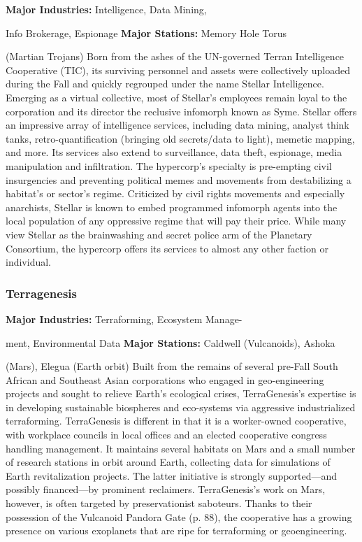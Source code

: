 \textbf{Major Industries:} Intelligence, Data Mining, 

Info Brokerage, Espionage
\textbf{Major Stations:} Memory Hole Torus 

(Martian Trojans)
Born from the ashes of the UN-governed Terran Intelligence
Cooperative (TIC), its surviving personnel and
assets were collectively uploaded during the Fall and 
quickly regrouped under the name Stellar Intelligence. 
Emerging as a virtual collective, most of Stellar's employees
remain loyal to the corporation and its director
the reclusive infomorph known as Syme. Stellar
offers an impressive array of intelligence services, 
including data mining, analyst think tanks, retro-quantification
(bringing old secrets/data to light),
memetic mapping, and more. Its services also extend 
to surveillance, data theft, espionage, media manipulation
and infiltration. The hypercorp's specialty is
pre-empting civil insurgencies and preventing political 
memes and movements from destabilizing a habitat's 
or sector's regime. Criticized by civil rights movements 
and especially anarchists, Stellar is known to embed 
programmed infomorph agents into the local population
of any oppressive regime that will pay their
price. While many view Stellar as the brainwashing 
and secret police arm of the Planetary Consortium, 
the hypercorp offers its services to almost any other 
faction or individual.

\subsubsection{Terragenesis}

\textbf{Major Industries:} Terraforming, Ecosystem Manage-

ment, Environmental Data
\textbf{Major Stations:} Caldwell (Vulcanoids), Ashoka 

(Mars), Elegua (Earth orbit)
Built from the remains of several pre-Fall South African
and Southeast Asian corporations who engaged
in geo-engineering projects and sought to relieve 
Earth's ecological crises, TerraGenesis's expertise is in 
developing sustainable biospheres and eco-systems via 
aggressive industrialized terraforming. TerraGenesis 
is different in that it is a worker-owned cooperative, 
with workplace councils in local offices and an elected 
cooperative congress handling management. It maintains
several habitats on Mars and a small number of
research stations in orbit around Earth, collecting data 
for simulations of Earth revitalization projects. The 
latter initiative is strongly supported—and possibly 
financed—by prominent reclaimers. TerraGenesis's 
work on Mars, however, is often targeted by preservationist
saboteurs. Thanks to their possession of the
Vulcanoid Pandora Gate (p. 88), the cooperative has a 
growing presence on various exoplanets that are ripe 
for terraforming or geoengineering.


